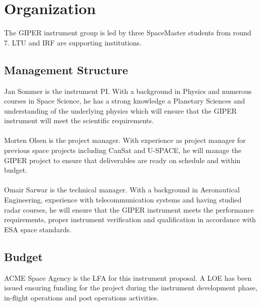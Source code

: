 \section{Organization}
%
The \ac{GIPER} instrument group is led by three SpaceMaster students from round 7. LTU and \ac{IRF} are supporting institutions.
%
\subsection{Management Structure}
%
\noindent
Jan Sommer is the instrument \ac{PI}. With a background in Physics and numerous courses in Space Science, he has a strong knowledge a Planetary Sciences and understanding of the underlying physics which will ensure that the \ac{GIPER} instrument will meet the scientific requirements.\\\\
%
\noindent
Morten Olsen is the project manager. With experience as project manager for previous space projects including CanSat and U-SPACE, he will manage the \ac{GIPER} project to ensure that deliverables are ready on schedule and within budget.\\\\
%
\noindent
Omair Sarwar is the technical manager. With a background in Aeronautical Engineering, experience with telecommunication systems and having studied radar courses, he will ensure that the \ac{GIPER} instrument meets the performance requirements, proper instrument verification and qualification in accordance with ESA space standards.
%
\subsection{Budget}
ACME Space Agency is the \ac{LFA} for this instrument proposal. A \ac{LOE} has been issued ensuring funding for the project during the instrument development phase, in-flight operations and post operations activities.